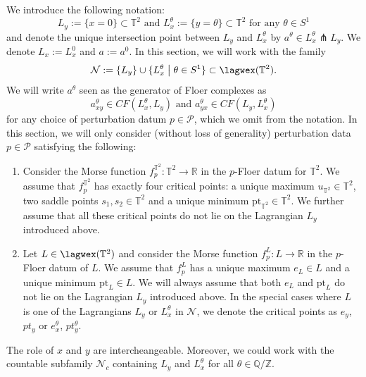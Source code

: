 We introduce the following notation: $$L_y:=\{x=0\}\subset \mathbb{T}^2\text{    and    }L^\theta_x:=\{y=\theta\}\subset \mathbb{T}^2 \text{  for any $\theta\in S^1$} $$ and denote the unique intersection point between $L_y$ and $L_x^\theta$ by $a^\theta\in L^\theta_x\pitchfork L_y.$ We denote $L_x:=L_x^0$ and $a:=a^0$. In this section, we will work with the family $$\mathcal{N}:=\{L_y\}\cup\{L_x^\theta\bigm| \theta\in S^1\}\subset \lagwex(\mathbb{T}^2).$$ %
We will write $a^\theta$ seen as the generator of Floer complexes as $$a^\theta_{xy}\in CF(L^\theta_x,L_y) \text{   and   } a^\theta_{yx}\in CF(L_y,L^\theta_x)$$ for any choice of perturbation datum $p\in \mathcal{P}$, which we omit from the notation. In this section, we will only consider (without loss of generality) perturbation data $p\in \mathcal{P}$ satisfying the following:
\begin{enumerate}
	\item Consider the Morse function $f^{\mathbb{T}^2}_p\colon \mathbb{T}^2\to \mathbb R$ in the $p$-Floer datum for $\mathbb{T}^2$. We assume that $f^{\mathbb{T}^2}_p$ has exactly four critical points: a unique maximum $u_{\mathbb{T}^2}\in \mathbb{T}^2$, two saddle points $s_1,s_2\in \mathbb{T}^2$ and a unique minimum $\text{pt}_{\mathbb{T}^2}\in \mathbb{T}^2$. We further assume that all these critical points do not lie on the Lagrangian $L_y$ introduced above.
	\item Let $L\in \lagwex(\mathbb{T}^2)$ and consider the Morse function $f^L_p\colon L\to \mathbb{R}$ in the $p$-Floer datum of $L$. We assume that $f^L_p$ has a unique maximum $e_L\in L$ and a unique minimum $\text{pt}_L\in L$. We will always assume that both $e_L$ and $\text{pt}_L$ do not lie on the Lagrangian $L_y$ introduced above. In the special cases where $L$ is one of the Lagrangians $L_y$ or $L_x^\theta$ in $\mathcal{N}$, we denote the critical points as $e_y$, $pt_y$ or $e_x^\theta$, $pt_y^\theta$.
\end{enumerate}
\begin{rem}
	The role of $x$ and $y$ are intercheangeable. Moreover, we could work with the countable subfamily $\mathcal{N}_c$ containing $L_y$ and $L_x^\theta$ for all $\theta \in \mathbb{Q}/\mathbb{Z}$.
\end{rem}

